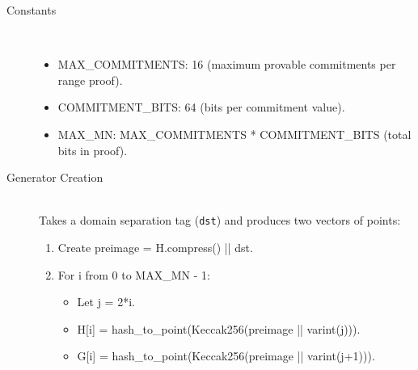 \begin{description}
\item[Constants] \hfill \\
\begin{itemize}
\item MAX\_COMMITMENTS: 16 (maximum provable commitments per range proof).  %
\item COMMITMENT\_BITS: 64 (bits per commitment value).  %
\item MAX\_MN: MAX\_COMMITMENTS * COMMITMENT\_BITS (total bits in proof).  %
\end{itemize}

\item[Generator Creation] \hfill \\
Takes a domain separation tag (\texttt{dst}) and produces two vectors of points: %
\begin{enumerate}
\item Create preimage = H.compress() || dst.  %
\item For i from 0 to MAX\_MN - 1: %
  \begin{itemize}
  \item Let j = 2*i.  %
  \item H[i] = hash\_to\_point(Keccak256(preimage || varint(j))).  %
  \item G[i] = hash\_to\_point(Keccak256(preimage || varint(j+1))).  %
  \end{itemize}
\end{enumerate}


\end{description}
